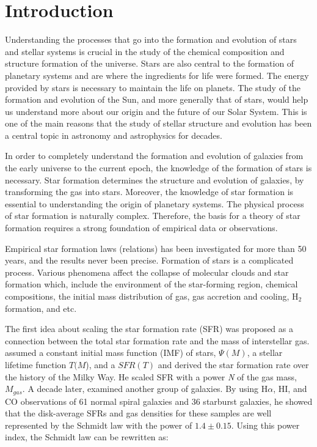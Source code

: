 \documentclass[useAMS,usenatbib]{mn2e}
\begin{document}
\section{Introduction}
\label{sec:intro} %
Understanding the processes that go into the formation and evolution of stars and stellar systems is crucial in the study of the chemical composition and structure formation of the universe. Stars are also central to the formation of planetary systems and are where the ingredients for life were formed. The energy provided by stars is necessary to maintain the life on planets. The study of the formation and evolution of the Sun, and more generally that of stars, would help us understand more about our origin and the future of our Solar System. This is one of the main reasons that the study of stellar structure and evolution has been a central topic in astronomy and astrophysics for decades.

In order to completely understand the formation and evolution of galaxies from the early universe to the current epoch, the knowledge of the formation of stars is necessary. Star formation determines the structure and evolution of galaxies, by transforming the gas into stars. Moreover, the knowledge of star formation is essential to understanding the origin of planetary systems. The physical process of star formation is naturally complex. Therefore, the basis for a theory of star formation requires a strong foundation of empirical data or observations.

Empirical star formation laws (relations) has been investigated for more than 50 years, and the results never been precise. Formation of stars is a complicated process. Various phenomena affect the collapse of molecular clouds and star formation which, include the environment of the star-forming region, chemical compositions, the initial mass distribution of gas, gas accretion and cooling, H$_2$ formation, and etc.

The first idea about scaling the star formation rate (SFR) was proposed as a connection between the total star formation rate and the mass of interstellar gas. \cite{Schmidt59} assumed a constant initial mass function (IMF) of stars, $\Psi (M)$, a stellar lifetime function {$T(M$)}, and a  {$SFR(T)$} and derived the star formation rate over the history of the Milky Way. He scaled SFR with a power {\it N} of the gas mass, $M_{gas}$. %
A decade later, \cite{Kennicutt98a} examined another group of galaxies. By using H$\alpha$, HI, and CO observations of 61 normal spiral galaxies and 36 starburst galaxies, he showed that the disk-average SFRs and gas densities for these samples are well represented by the Schmidt law with the power of $1.4 \pm 0.15$. Using this power index, the Schmidt law can be rewritten as:
\end{document}
